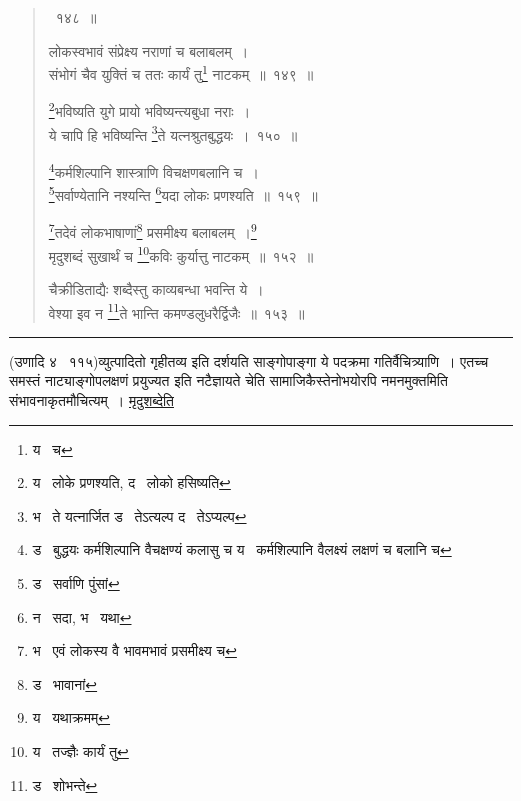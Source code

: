 \documentclass[11pt, openany]{book}
\begin{document}
\newpage

\begin{quote}
{~१४८~॥

लोकस्वभावं संप्रेक्ष्य नराणां च बलाबलम्~।\\
संभोगं चैव युक्तिं च ततः कार्यं तु\renewcommand{\thefootnote}{4}\footnote{य \textendash\ च} नाटकम्~॥~१४९~॥

\renewcommand{\thefootnote}{5}\footnote{य \textendash\ लोके प्रणश्यति, द \textendash\ लोको हसिष्यति}भविष्यति युगे प्रायो भविष्यन्त्यबुधा नराः~।\\
ये चापि हि भविष्यन्ति \renewcommand{\thefootnote}{6}\footnote{भ \textendash\ ते यत्नार्जित ड \textendash\ तेऽत्यल्प द \textendash\ तेऽप्यल्प}ते यत्नश्रुतबुद्धयः~।~१५०~॥

\renewcommand{\thefootnote}{7}\footnote{ड \textendash\ बुद्धयः कर्मशिल्पानि वैचक्षण्यं कलासु च य \textendash\ कर्मशिल्पानि वैलक्ष्यं लक्षणं च बलानि च }कर्मशिल्पानि शास्त्राणि विचक्षणबलानि च~।\\
\renewcommand{\thefootnote}{8}\footnote{ड \textendash\ सर्वाणि पुंसां}सर्वाण्येतानि नश्यन्ति \renewcommand{\thefootnote}{9}\footnote{न \textendash\ सदा, भ \textendash\ यथा}यदा लोकः प्रणश्यति~॥~१५९~॥

\renewcommand{\thefootnote}{10}\footnote{भ \textendash\ एवं लोकस्य वै भावमभावं प्रसमीक्ष्य च}तदेवं लोकभाषाणां\renewcommand{\thefootnote}{11}\footnote{ड \textendash\ भावानां} प्रसमीक्ष्य बलाबलम्~।\renewcommand{\thefootnote}{12}\footnote{य \textendash\ यथाक्रमम्} \\
मृदुशब्दं सुखार्थं च \renewcommand{\thefootnote}{13}\footnote{य \textendash\ तज्ज्ञैः कार्यं तु}कविः कुर्यात्तु नाटकम्~॥~१५२~॥

चैक्रीडिताद्यैः शब्दैस्तु काव्यबन्धा भवन्ति ये~।\\
वेश्या इव न \renewcommand{\thefootnote}{14}\footnote{ड \textendash\ शोभन्ते}ते भान्ति कमण्डलुधरैर्द्विजैः~॥~१५३~॥}
\end{quote}

\hrule

\vspace{2mm}
\noindent
(उणादि ४ \textendash\ ११५)व्युत्पादितो गृहीतव्य इति दर्शयति साङ्गोपाङ्गा ये पदक्रमा गतिर्वैचित्र्याणि~। एतच्च समस्तं नाट्याङ्गोपलक्षणं प्रयुज्यत इति नटैज्ञायते चेति सामाजिकैस्तेनोभयोरपि नमनमुक्तमिति संभावनाकृतमौचित्यम्~। \underline{मृदुशब्देति}
\end{document}
